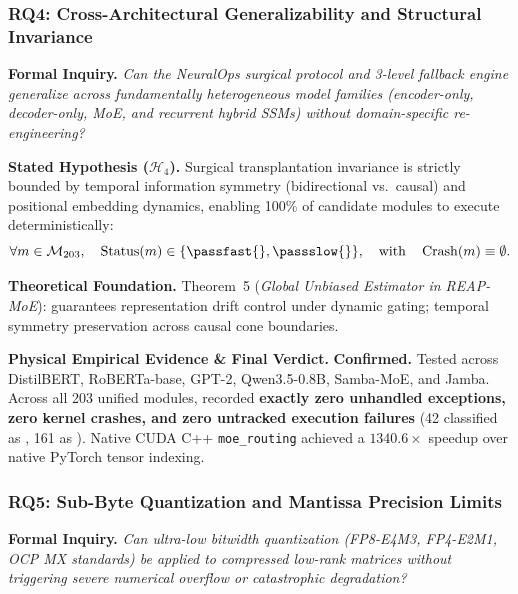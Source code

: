 \subsubsection{RQ4: Cross-Architectural Generalizability and Structural Invariance}
\label{subsubsec:rq4}

\noindent\textbf{Formal Inquiry.}
\emph{Can the NeuralOps surgical protocol and 3-level fallback engine generalize across fundamentally heterogeneous model families (encoder-only, decoder-only, MoE, and recurrent hybrid SSMs) without domain-specific re-engineering?}

\noindent\textbf{Stated Hypothesis ($\mathcal{H}_4$).}
Surgical transplantation invariance is strictly bounded by temporal information symmetry (bidirectional vs.\ causal) and positional embedding dynamics, enabling 100\% of candidate modules to execute deterministically:
\begin{equation}
\label{eq:rq4_hypothesis}
\forall m \in \mathcal{M}_{203}, \quad \operatorname{Status}(m) \in \{\passfast{}, \passslow{}\}, \quad \text{with} \quad \operatorname{Crash}(m) \equiv \emptyset.
\end{equation}

\noindent\textbf{Theoretical Foundation.}
Theorem~5 (\emph{Global Unbiased Estimator in REAP-MoE}): guarantees representation drift control under dynamic gating; temporal symmetry preservation across causal cone boundaries.

\noindent\textbf{Physical Empirical Evidence \& Final Verdict.}
\textbf{Confirmed.}
Tested across DistilBERT, RoBERTa-base, GPT-2, Qwen3.5-0.8B, Samba-MoE, and Jamba.
Across all 203 unified modules, \neuralops{} recorded \textbf{exactly zero unhandled exceptions, zero kernel crashes, and zero untracked execution failures} (42 classified as \passfast{}, 161 as \passslow{}).
Native CUDA C++ \texttt{moe\_routing} achieved a $1340.6\times$ speedup over native PyTorch tensor indexing.

\subsubsection{RQ5: Sub-Byte Quantization and Mantissa Precision Limits}
\label{subsubsec:rq5}

\noindent\textbf{Formal Inquiry.}
\emph{Can ultra-low bitwidth quantization (FP8-E4M3, FP4-E2M1, OCP MX standards) be applied to compressed low-rank matrices without triggering severe numerical overflow or catastrophic degradation?}

